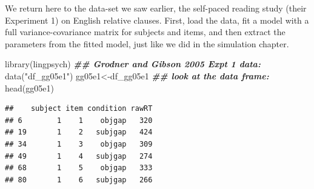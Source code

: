 \documentclass[
  12pt,
]{krantz}
\newenvironment{Shaded}{\begin{snugshade}}{\end{snugshade}}
\newcommand{\AttributeTok}[1]{\textcolor[rgb]{0.77,0.63,0.00}{#1}}
\newcommand{\ConstantTok}[1]{\textcolor[rgb]{0.00,0.00,0.00}{#1}}
\newcommand{\DecValTok}[1]{\textcolor[rgb]{0.00,0.00,0.81}{#1}}
\newcommand{\DocumentationTok}[1]{\textcolor[rgb]{0.56,0.35,0.01}{\textbf{\textit{#1}}}}
\newcommand{\FunctionTok}[1]{\textcolor[rgb]{0.00,0.00,0.00}{#1}}
\newcommand{\NormalTok}[1]{#1}
\newcommand{\OtherTok}[1]{\textcolor[rgb]{0.56,0.35,0.01}{#1}}
\newcommand{\SpecialCharTok}[1]{\textcolor[rgb]{0.00,0.00,0.00}{#1}}
\newcommand{\StringTok}[1]{\textcolor[rgb]{0.31,0.60,0.02}{#1}}
\theoremstyle{definition}
\theoremstyle{definition}
\theoremstyle{definition}
\theoremstyle{definition}
\theoremstyle{remark}
\begin{document}
We return here to the data-set we saw earlier, the \citet{grodner} self-paced reading study (their Experiment 1) on English relative clauses.
First, load the data, fit a model with a full variance-covariance matrix for subjects and items, and then extract the parameters from the fitted model, just like we did in the simulation chapter.

\begin{Shaded}
\begin{Highlighting}[]
\FunctionTok{library}\NormalTok{(lingpsych)}
\DocumentationTok{\#\# Grodner and Gibson 2005 Expt 1 data:}
\FunctionTok{data}\NormalTok{(}\StringTok{"df\_gg05e1"}\NormalTok{)}
\NormalTok{gg05e1}\OtherTok{\textless{}{-}}\NormalTok{df\_gg05e1}
\DocumentationTok{\#\# look at the data frame:}
\FunctionTok{head}\NormalTok{(gg05e1)}
\end{Highlighting}
\end{Shaded}

\begin{verbatim}
##    subject item condition rawRT
## 6        1    1    objgap   320
## 19       1    2   subjgap   424
## 34       1    3    objgap   309
## 49       1    4   subjgap   274
## 68       1    5    objgap   333
## 80       1    6   subjgap   266
\end{verbatim}

\begin{Shaded}
\end{Shaded}
\end{document}
